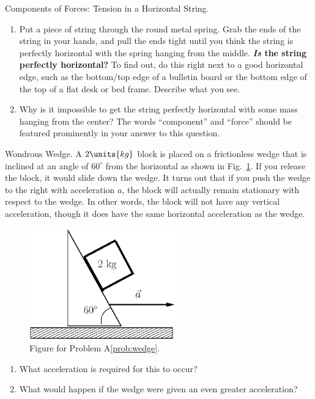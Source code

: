 \begin{aproblem}{Components of Forces: Tension in a Horizontal
    String.}
  \begin{enumerate}
  \item Put a piece of string through the round metal spring.  Grab
    the ends of the string in your hands, and pull the ends tight
    until you think the string is perfectly horizontal with the spring
    hanging from the middle.  {\bf {\em Is} the string perfectly
      horizontal?}  To find out, do this right next to a good
    horizontal edge, such as the bottom/top edge of a bulletin board
    or the bottom edge of the top of a flat desk or bed frame.
    Describe what you see.

  \item Why is it impossible to get the string perfectly horizontal
    with some mass hanging from the center?  The words ``component''
    and ``force'' should be featured prominently in your answer to
    this question.
   \end{enumerate}
\end{aproblem}

\begin{aproblem}{Wondrous Wedge.}  
  A $2\units{kg}$ block is placed on a frictionless wedge that is
  inclined at an angle of $60^\circ$ from the horizontal as shown in
  Fig.~\ref{fig:wedge}.  If you release the block, it would slide down
  the wedge.  It turns out that if you push the wedge to the right
  with acceleration $a$, the block will actually remain stationary
  with respect to the wedge.  In other words, the block will not have
  any vertical acceleration, though it does have the same horizontal
  acceleration as the wedge.
  \begin{figure}[h]
    \begin{center}
    \includegraphics[width=2.5in]{additional_problems/wedge.eps}
    \end{center}
    \caption{Figure for Problem A\ref{prob:wedge}.}
    \label{fig:wedge}
  \end{figure}
  \begin{enumerate}
  \item What acceleration is required for this to occur?
  \item What would happen if the wedge were given an even greater
    acceleration?
  \end{enumerate}
  \label{prob:wedge}
\end{aproblem}



